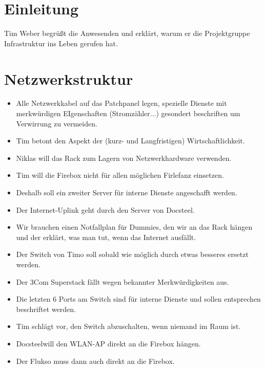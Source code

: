 \documentclass[parskip]{scrartcl}
\newcommand\docsteel{Docsteel}
\begin{document}
\tableofcontents

\section{Einleitung}

Tim Weber begrüßt die Anwesenden und erklärt, warum er die Projektgruppe Infrastruktur ins Leben gerufen hat.

\section{Netzwerkstruktur}

\begin{itemize}

\item{} Alle Netzwerkkabel auf das Patchpanel legen, spezielle Dienste mit merkwürdigen EIgenschaften (Stromzähler...) gesondert beschriften
um Verwirrung zu vermeiden.

\item{} Tim betont den Aspekt der (kurz- und Langfristigen) Wirtschaftlichkeit.

\item{} Niklas will das Rack zum Lagern von Netzwerkhardware verwenden.

\item{} Tim will die Firebox nicht für allen möglichen Firlefanz einsetzen.
\item{} Deshalb soll ein zweiter Server für interne Dienste angeschafft werden.

\item{} Der Internet-Uplink geht durch den Server von \docsteel.

\item{} Wir brauchen einen Notfallplan für Dummies, den wir an das Rack hängen und der erklärt, was man tut, wenn
das Internet ausfällt.

\item{} Der Switch von Timo soll sobald wie möglich durch etwas besseres ersetzt werden.
\item{} Der 3Com Superstack fällt wegen bekannter Merkwürdigkeiten aus.
\item{} Die letzten 6 Ports am Switch sind für interne Dienste und sollen entsprechen beschriftet werden.

\item{} Tim schlägt vor, den Switch abzuschalten, wenn niemand im Raum ist.
\item{} \docsteel will den WLAN-AP direkt an die Firebox hängen.
\item{} Der Flukso muss dann auch direkt an die Firebox.

\end{itemize}
\end{document}
